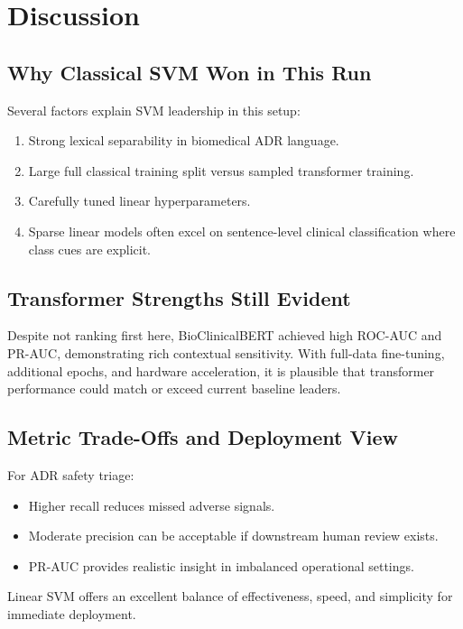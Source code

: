 \documentclass[11pt]{article}
\begin{document}
\section{Discussion}

\subsection{Why Classical SVM Won in This Run}

Several factors explain SVM leadership in this setup:


\begin{enumerate}
  \item Strong lexical separability in biomedical ADR language.
  \item Large full classical training split versus sampled transformer training.
  \item Carefully tuned linear hyperparameters.
  \item Sparse linear models often excel on sentence-level clinical classification where class cues are explicit.
\end{enumerate}

\subsection{Transformer Strengths Still Evident}

Despite not ranking first here, BioClinicalBERT achieved high ROC-AUC and PR-AUC, demonstrating rich contextual sensitivity. With full-data fine-tuning, additional epochs, and hardware acceleration, it is plausible that transformer performance could match or exceed current baseline leaders.


\subsection{Metric Trade-Offs and Deployment View}

For ADR safety triage:


\begin{itemize}
  \item Higher recall reduces missed adverse signals.
  \item Moderate precision can be acceptable if downstream human review exists.
  \item PR-AUC provides realistic insight in imbalanced operational settings.
\end{itemize}

Linear SVM offers an excellent balance of effectiveness, speed, and simplicity for immediate deployment.
\end{document}
